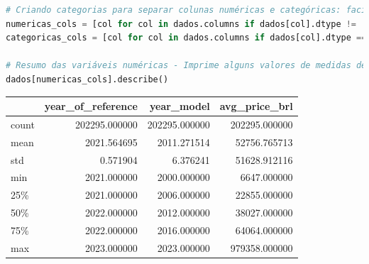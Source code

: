 \begin{lstlisting}[language=Python, style=input]
# Criando categorias para separar colunas numéricas e categóricas: facilita a AED
numericas_cols = [col for col in dados.columns if dados[col].dtype != 'object']
categoricas_cols = [col for col in dados.columns if dados[col].dtype == 'object']

# Resumo das variáveis numéricas - Imprime alguns valores de medidas de tendências centrais 
dados[numericas_cols].describe()
\end{lstlisting}
\begin{table}[H]
\centering
\begin{tabular}{lrrr}
\hline
 & \textbf{year\_of\_reference} & \textbf{year\_model} & \textbf{avg\_price\_brl} \\
\hline
count & 202295.000000 & 202295.000000 & 202295.000000 \\
mean & 2021.564695 & 2011.271514 & 52756.765713 \\
std  & 0.571904 & 6.376241 & 51628.912116 \\
min  & 2021.000000 & 2000.000000 & 6647.000000 \\
25\% & 2021.000000 & 2006.000000 & 22855.000000 \\
50\% & 2022.000000 & 2012.000000 & 38027.000000 \\
75\% & 2022.000000 & 2016.000000 & 64064.000000 \\
max  & 2023.000000 & 2023.000000 & 979358.000000 \\
\hline
\end{tabular}
\label{tab:vehicle_stats}
\end{table}

